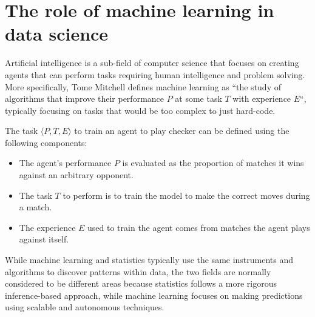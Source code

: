 \documentclass{report}
\begin{document}
\section{The role of machine learning in data science}
Artificial intelligence is a sub-field of computer science that focuses on creating agents that can perform tasks requiring human intelligence and problem solving. \newline
More specifically, Tome Mitchell defines machine learning as ``the study of algorithms that improve their performance $\displaystyle P$ at some task $\displaystyle T$ with experience $\displaystyle E$``, typically focusing on tasks that would be too complex to just hard-code.
\begin{examplebox}
    The task $\displaystyle \langle P, T, E \rangle$ to train an agent to play checker can be defined using the following components:
    \begin{itemize}
        \item The agent's performance $\displaystyle P$ is evaluated as the proportion of matches it wins against an arbitrary opponent.
        \item The task $\displaystyle T$ to perform is to train the model to make the correct moves during a match.
        \item The experience $\displaystyle E$ used to train the agent comes from matches the agent plays against itself.
    \end{itemize}
\end{examplebox}
\noindent While machine learning and statistics typically use the same instruments and algorithms to discover patterns within data, the two fields are normally considered to be different areas because statistics follows a more rigorous inference-based approach, while machine learning focuses on making predictions using scalable and autonomous techniques.
\end{document}
